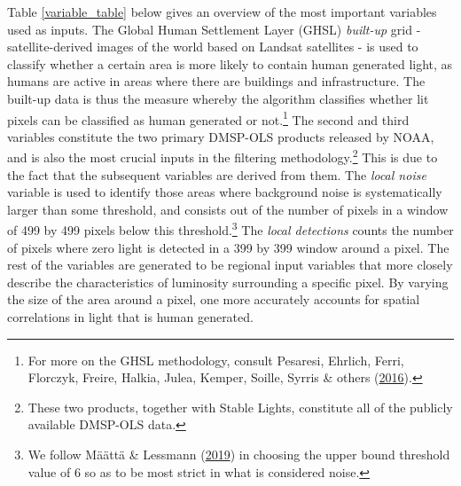 \documentclass[11pt,preprint, authoryear]{elsarticle}
\numberwithin{equation}{section}
\numberwithin{figure}{section}
\numberwithin{table}{section}
\let\rmarkdownfootnote\footnote%
\def\footnote{\protect\rmarkdownfootnote}
\begin{document}
Table \ref{variable_table} below gives an overview of the most important
variables used as inputs. The Global Human Settlement Layer (GHSL)
\emph{built-up} grid - satellite-derived images of the world based on
Landsat satellites - is used to classify whether a certain area is more
likely to contain human generated light, as humans are active in areas
where there are buildings and infrastructure. The built-up data is thus
the measure whereby the algorithm classifies whether lit pixels can be
classified as human generated or not.\footnote{For more on the GHSL
  methodology, consult Pesaresi, Ehrlich, Ferri, Florczyk, Freire,
  Halkia, Julea, Kemper, Soille, Syrris \& others
  (\protect\hyperlink{ref-pesaresi2016operating}{2016}).} The second and
third variables constitute the two primary DMSP-OLS products released by
NOAA, and is also the most crucial inputs in the filtering
methodology.\footnote{These two products, together with Stable Lights,
  constitute all of the publicly available DMSP-OLS data.} This is due
to the fact that the subsequent variables are derived from them. The
\emph{local noise} variable is used to identify those areas where
background noise is systematically larger than some threshold, and
consists out of the number of pixels in a window of 499 by 499 pixels
below this threshold.\footnote{We follow Määttä \& Lessmann
  (\protect\hyperlink{ref-maatta}{2019}) in choosing the upper bound
  threshold value of 6 so as to be most strict in what is considered
  noise.} The \emph{local detections} counts the number of pixels where
zero light is detected in a 399 by 399 window around a pixel. The rest
of the variables are generated to be regional input variables that more
closely describe the characteristics of luminosity surrounding a
specific pixel. By varying the size of the area around a pixel, one more
accurately accounts for spatial correlations in light that is human
generated.
\end{document}
